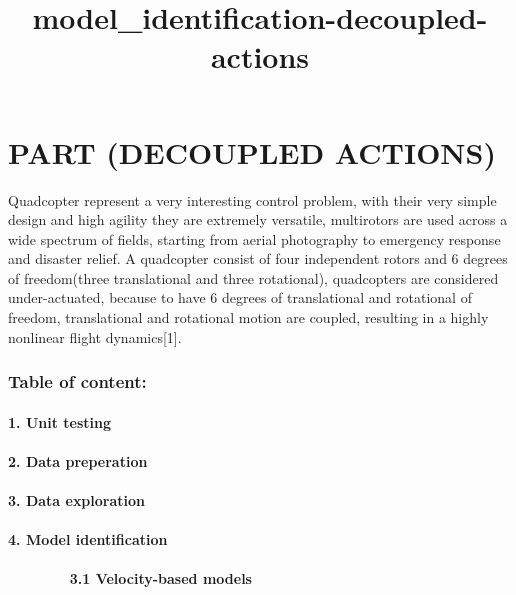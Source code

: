 \documentclass[11pt]{article}
\title{model\_identification-decoupled-actions}
\begin{document}
    
    
    \maketitle
    
    

    
    \section{PART \textbar{} (DECOUPLED
ACTIONS)}\label{part-decoupled-actions}

    Quadcopter represent a very interesting control problem, with their very
simple design and high agility they are extremely versatile, multirotors
are used across a wide spectrum of fields, starting from aerial
photography to emergency response and disaster relief. A quadcopter
consist of four independent rotors and 6 degrees of freedom(three
translational and three rotational), quadcopters are considered
under-actuated, because to have 6 degrees of translational and
rotational of freedom, translational and rotational motion are coupled,
resulting in a highly nonlinear flight dynamics{[}1{]}.

    \subsubsection{Table of content:}\label{table-of-content}

\paragraph{1. Unit testing}\label{unit-testing}

\paragraph{2. Data preperation}\label{data-preperation}

\paragraph{3. Data exploration}\label{data-exploration}

\paragraph{4. Model identification}\label{model-identification}

\paragraph{~~~~~~ ~3.1 Velocity-based
models}\label{velocity-based-models}
\end{document}
